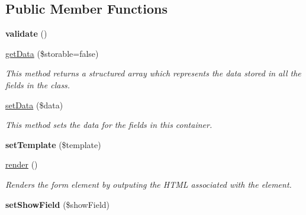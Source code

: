 \subsection*{Public Member Functions}
\begin{DoxyCompactItemize}
\item 
\hypertarget{class_multi_elements_a3e463b94b318a35663e4105b303765c0}{
{\bfseries validate} ()}
\label{class_multi_elements_a3e463b94b318a35663e4105b303765c0}

\item 
\hyperlink{class_multi_elements_ab8b2e6f6ae29cdb9e0697fce659636c2}{getData} (\$storable=false)
\begin{DoxyCompactList}\small\item\em This method returns a structured array which represents the data stored in all the fields in the class. \item\end{DoxyCompactList}\item 
\hyperlink{class_multi_elements_ab7205e4715c9e8d02a698ceac1597f4f}{setData} (\$data)
\begin{DoxyCompactList}\small\item\em This method sets the data for the fields in this container. \item\end{DoxyCompactList}\item 
\hypertarget{class_multi_elements_a868d87cf7cc235dc8bdcaf122f75a1d0}{
{\bfseries setTemplate} (\$template)}
\label{class_multi_elements_a868d87cf7cc235dc8bdcaf122f75a1d0}

\item 
\hyperlink{class_multi_elements_a70cf310cca207dc983733da873145632}{render} ()
\begin{DoxyCompactList}\small\item\em Renders the form element by outputing the HTML associated with the element. \item\end{DoxyCompactList}\item 
\hypertarget{class_multi_elements_aec3fd7e17e77d30fccac65f865e9f361}{
{\bfseries setShowField} (\$showField)}
\label{class_multi_elements_aec3fd7e17e77d30fccac65f865e9f361}

\end{DoxyCompactItemize}

